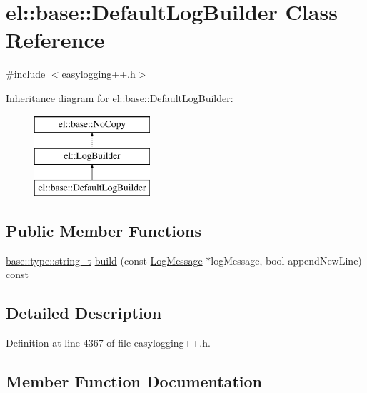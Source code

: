 \hypertarget{classel_1_1base_1_1_default_log_builder}{}\section{el\+:\+:base\+:\+:Default\+Log\+Builder Class Reference}
\label{classel_1_1base_1_1_default_log_builder}


{\ttfamily \#include $<$easylogging++.\+h$>$}

Inheritance diagram for el\+:\+:base\+:\+:Default\+Log\+Builder\+:\begin{figure}[H]
\begin{center}
\leavevmode
\includegraphics[height=3.000000cm]{classel_1_1base_1_1_default_log_builder}
\end{center}
\end{figure}
\subsection*{Public Member Functions}
\begin{DoxyCompactItemize}
\item 
\hyperlink{namespaceel_1_1base_1_1type_a67e406cd213c231f1d135b5a4eda64b5}{base\+::type\+::string\+\_\+t} \hyperlink{classel_1_1base_1_1_default_log_builder_aa8d2f42068115d899ed81de1b0ed360e}{build} (const \hyperlink{classel_1_1_log_message}{Log\+Message} $\ast$log\+Message, bool append\+New\+Line) const 
\end{DoxyCompactItemize}


\subsection{Detailed Description}


Definition at line 4367 of file easylogging++.\+h.



\subsection{Member Function Documentation}
\hypertarget{classel_1_1base_1_1_default_log_builder_aa8d2f42068115d899ed81de1b0ed360e}{}
